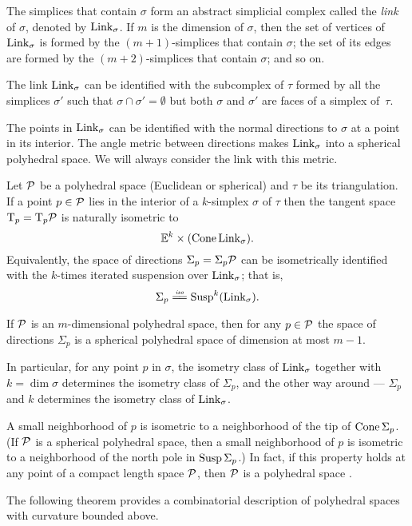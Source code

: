 The simplices that  contain $\sigma$
form an abstract simplicial complex called the \emph{link} of $\sigma$, 
denoted by $\mathop{\rm Link}\nolimits_\sigma$.
If $m$ is  the dimension of $\sigma$,
then the set of vertices of $\mathop{\rm Link}\nolimits_\sigma$
is formed by the $(m+1)$-simplices that  contain $\sigma$;
the set of its edges are formed by the $(m+2)$-simplices 
that contain $\sigma$; and so on.

The link $\mathop{\rm Link}\nolimits_\sigma$
can be identified with the subcomplex of $\tau$ 
formed by all the simplices $\sigma'$ 
such that $\sigma\cap\sigma'=\emptyset$ 
but both $\sigma$ and $\sigma'$ are faces of a simplex of~$\tau$.

The points in $\mathop{\rm Link}\nolimits_\sigma$ can be identified with the normal directions to $\sigma$ at a point in its interior.
The angle metric between directions makes  $\mathop{\rm Link}\nolimits_\sigma$ into a spherical polyhedral space.
We will always consider the link with this metric.

Let $\mathcal{P}$ be a polyhedral space (Euclidean or spherical) and  $\tau$ be its triangulation.
If a point $p\in \mathcal{P}$ 
lies in the interior of a $k$-simplex $\sigma$ of $\tau$ 
then the tangent space $\mathrm{T}_p=\mathrm{T}_p\mathcal{P}$
is  naturally isometric to
\[\mathbb{E}^k\times(\mathop{\rm Cone}\nolimits\mathop{\rm Link}\nolimits_\sigma).\]
Equivalently, the space of directions $\Sigma_p=\Sigma_p\mathcal{P}$
can be isometrically identified with the 
$k$-times iterated suspension over $\mathop{\rm Link}\nolimits_\sigma$;
that is, 
\[\Sigma_p\iso\Susp^{k}(\Link_\sigma).\]

If $\mathcal{P}$ is an $m$-dimensional polyhedral space,
then for any $p\in \mathcal{P}$
the space of directions $\Sigma_p$ is a spherical polyhedral space
of dimension at most $m-1$. 

In particular, 
for any point $p$ in $\sigma$,
the isometry class of $\mathop{\rm Link}\nolimits_\sigma$ together with $k=\dim\sigma$
determines the isometry class of $\Sigma_p$, 
 and the other way around --- $\Sigma_p$ and $k$ determines the isometry class of $\mathop{\rm Link}\nolimits_\sigma$.

A small neighborhood of $p$ is isometric to a neighborhood of the tip of $\mathop{\rm Cone}\nolimits\Sigma_p$. 
(If $\mathcal{P}$ is a spherical polyhedral space, then a small neighborhood of $p$ is isometric to a neighborhood of the north pole in $\mathop{\rm Susp}\nolimits\Sigma_p$.)
In fact, if this property holds at any point of a compact length space $\mathcal{P}$,
then  $\mathcal{P}$ is a polyhedral space \cite{lebedeva-petrunin}.

The following theorem provides a combinatorial description of polyhedral spaces with curvature bounded above.


